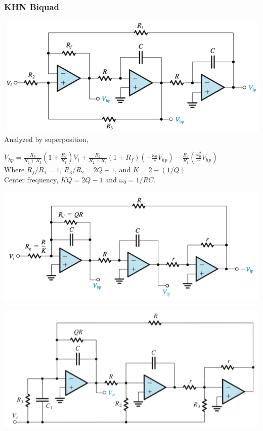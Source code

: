 \documentclass[11pt]{article}
\begin{document}
    \subsubsection{KHN Biquad}

    \includegraphics[width=\textwidth]{khn}
    Analyzed by superposition, 
 
    $V_{hp} = \frac{R_3}{R_2+R_3}(1+ \frac{R_f}{R_1})V_i + \frac{R_2}{R_2 + R_3}(1 + R_f)(-\frac{\omega_0}{s} V_{hp}) - \frac{R_f}{R_1}(\frac{\omega_{0}^2}{s^2} V_{hp})$  \\

    Where $R_f/R_1 = 1$, $R_3/R_2 = 2Q - 1$, and $K = 2 - (1/Q)$ \\
     
    Center frequency, $KQ = 2Q - 1$ and $\omega_0 = 1/RC$.
    
    \includegraphics[width=\textwidth]{tow}

    \includegraphics[width=\textwidth]{tow-feed} 
\end{document}
